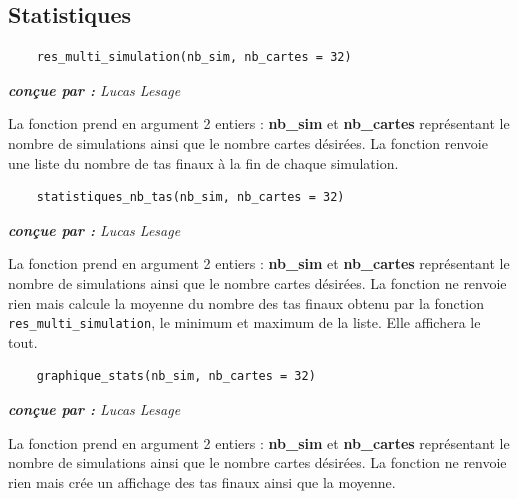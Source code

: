 \documentclass[titlepage]{article}
\begin{document}
\subsection{Statistiques}
\noindent	\begin{minipage}{\textwidth}
	\begin{lstlisting}
	res_multi_simulation(nb_sim, nb_cartes = 32) 
	\end{lstlisting}	
	\end{minipage}

\emph{\textbf{conçue par : } Lucas Lesage} \vspace{2mm}\par

La fonction prend en argument 2 entiers : \textbf{nb\_sim} et \textbf{nb\_cartes} représentant le nombre de simulations ainsi que le nombre cartes désirées. La fonction renvoie une liste du nombre de tas finaux à la fin de chaque simulation. \vspace{5mm}

\noindent	\begin{minipage}{\textwidth}
	\begin{lstlisting}
	statistiques_nb_tas(nb_sim, nb_cartes = 32)
	\end{lstlisting}	
	\end{minipage}

\emph{\textbf{conçue par : } Lucas Lesage} \vspace{2mm}\par

La fonction prend en argument 2 entiers : \textbf{nb\_sim} et \textbf{nb\_cartes} représentant le nombre de simulations ainsi que le nombre cartes désirées.  La fonction ne renvoie rien mais calcule la moyenne du nombre des tas finaux obtenu par la fonction \texttt{res\_multi\_simulation}, le minimum et maximum de la liste. Elle affichera le tout.

\noindent	\begin{minipage}{\textwidth}
	\begin{lstlisting}
	graphique_stats(nb_sim, nb_cartes = 32)
	\end{lstlisting}	
	\end{minipage}

\emph{\textbf{conçue par : } Lucas Lesage} \vspace{2mm}\par

La fonction prend en argument 2 entiers : \textbf{nb\_sim} et \textbf{nb\_cartes} représentant le nombre de simulations ainsi que le nombre cartes désirées.  La fonction ne renvoie rien mais crée un affichage des tas finaux ainsi que la moyenne.\vspace{1mm}\par
\end{document}
